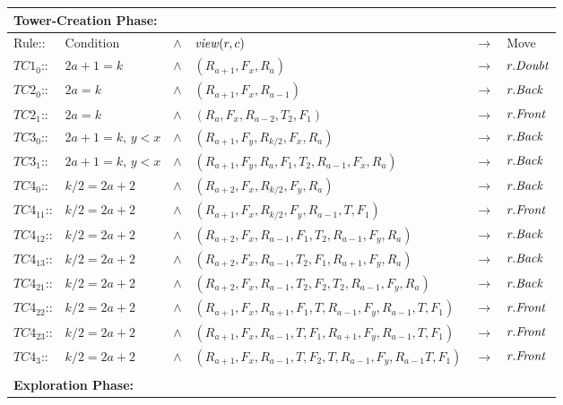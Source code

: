 \begin{landscape}
\begin{table}
\centering
\begin{tabular}{|l l c  l c l|}
\hline
\multicolumn{6}{|l|}{\textbf{Tower-Creation Phase: }} \\[1pt] \hline
Rule:: & Condition & $\land$ & $\mathit{view}(r, c)$&$\rightarrow$&Move\\
\hline
$TC1_0$:: &{ $2a+1=k$}& $\land$ &${  (R_{a+1}, F_x, R_a)}$&
$\rightarrow$&$r.\textit{Doubt}$\\
$TC2_0$:: &{ $2a = k$}&$\land$ &${   (R_{a+1}, F_x, R_{a-1})}$&
$\rightarrow$&$r.\textit{Back}$\\
$TC2_1$:: &{ $2a = k$}&$\land$ &${  
 (R_{a}, F_x, R_{a-2}, T_2, F_1)}$&
$\rightarrow$&$r.\textit{Front}$\\
$TC3_0$:: &{ $2a+1 = k$, $y<x$}&$\land$ &
${   (R_{a+1}, F_y, R_{k/2}, F_x, R_a)}$&$\rightarrow$&
$r.\textit{Back}$\\ 
$TC3_1$:: &{ $2a+1 = k$, $y<x$}&$\land$ &
${   (R_{a+1}, F_y, R_{a}, F_1, T_2, R_{a-1}, F_x, R_a)}$&
$\rightarrow$&$r.\textit{Back}$\\
$TC4_0$:: &{ $k/2 = 2a+2$}&$\land$ &
${  (R_{a+2}, F_x, R_{k/2}, F_y, R_{a})}$&
$\rightarrow$&$r.\textit{Back}$\\
$TC4_{11}$:: &{ $k/2 = 2a+2$}&$\land$ &
${  (R_{a+1}, F_x, R_{k/2}, F_y, R_{a-1}, T, F_1)}$&
$\rightarrow$&$r.\textit{Front}$\\
$TC4_{12}$:: &{ $k/2 = 2a+2$}&$\land$ &
${  (R_{a+2}, F_x, R_{a-1}, F_1, T_2, R_{a-1}, F_y, R_{a})}$&
$\rightarrow$&$r.\textit{Back}$\\
$TC4_{13}$:: &{ $k/2 = 2a+2$}&$\land$ &
${  (R_{a+2}, F_x, R_{a-1}, T_2, F_1, R_{a+1}, F_y, R_{a})}$&
$\rightarrow$&$r.\textit{Back}$\\ 
$TC4_{21}$:: &{ $k/2 = 2a+2$}&$\land$ &
${  (R_{a+2}, F_x, R_{a-1}, T_2, F_2, T_2, R_{a-1}, F_y, R_{a})}$&
$\rightarrow$&$r.\textit{Back}$\\
$TC4_{22}$:: &{ $k/2 = 2a+2$}&$\land$ &
${  (R_{a+1}, F_x, R_{a+1}, F_1, T, R_{a-1}, F_y, R_{a-1}, T, F_1)}$&
$\rightarrow$&$r.\textit{Front}$\\
$TC4_{23}$:: &{ $k/2 = 2a+2$}&$\land$ &
${  (R_{a+1}, F_x, R_{a-1}, T, F_1, R_{a+1}, F_y, R_{a-1}, T, F_1)}$&
$\rightarrow$&$r.\textit{Front}$\\
$TC4_{3}$:: &{ $k/2 = 2a+2$}&$\land$ &
${  (R_{a+1}, F_x, R_{a-1}, T, F_2, T, R_{a-1}, F_y, R_{a-1} T, F_1)}$&
$\rightarrow$&$r.\textit{Front}$\\ \hline 
\multicolumn{6}{l}{ } \\[1pt] \hline
\multicolumn{6}{|l|}{\textbf{Exploration Phase: }} \\[1pt] \hline

\end{tabular}
\end{table}
\end{landscape}
